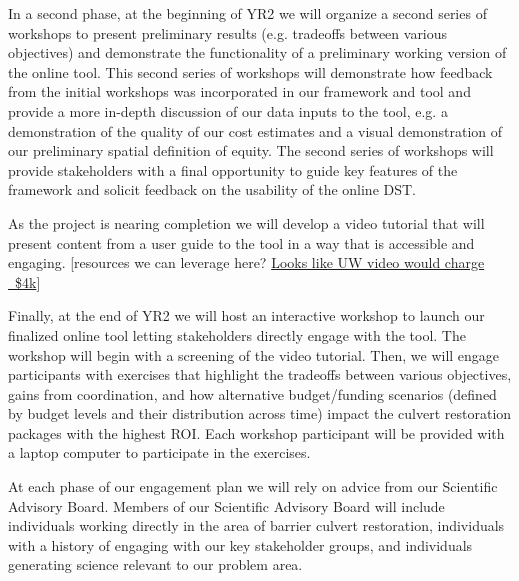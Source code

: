 \documentclass[12pt]{elsarticle}
\begin{document}
In a second phase, at the beginning of YR2 we will organize a second series of workshops to present preliminary results (e.g. tradeoffs between various objectives) and demonstrate the functionality of a preliminary working version of the online tool. This second series of workshops will demonstrate how feedback from the initial workshops was incorporated in our framework and tool and provide a more in-depth discussion of our data inputs to the tool, e.g. a demonstration of the quality of our cost estimates and a visual demonstration of our preliminary spatial definition of equity. The second series of workshops will provide stakeholders with a final opportunity to guide key features of the framework and solicit feedback on the usability of the online DST.

As the project is nearing completion we will develop a video tutorial that will present content from a user guide to the tool in a way that is accessible and engaging. [resources we can leverage here? \href{https://www.washington.edu/video/our-services/examples-of-our-work/}{Looks like UW video would charge ~\$4k}]

Finally, at the end of YR2 we will host an interactive workshop to launch our finalized online tool letting stakeholders directly engage with the tool. The workshop will begin with a screening of the video tutorial. Then, we will engage participants with exercises that highlight the tradeoffs between various objectives, gains from coordination, and how alternative budget/funding scenarios (defined by budget levels and their distribution across time) impact the culvert restoration packages with the highest ROI. Each workshop participant will be provided with a laptop computer to participate in the exercises. 

At each phase of our engagement plan we will rely on advice from our Scientific Advisory Board. Members of our Scientific Advisory Board will include individuals working directly in the area of barrier culvert restoration, individuals with a history of engaging with our key stakeholder groups, and individuals generating science relevant to our problem area. 


\end{document}
